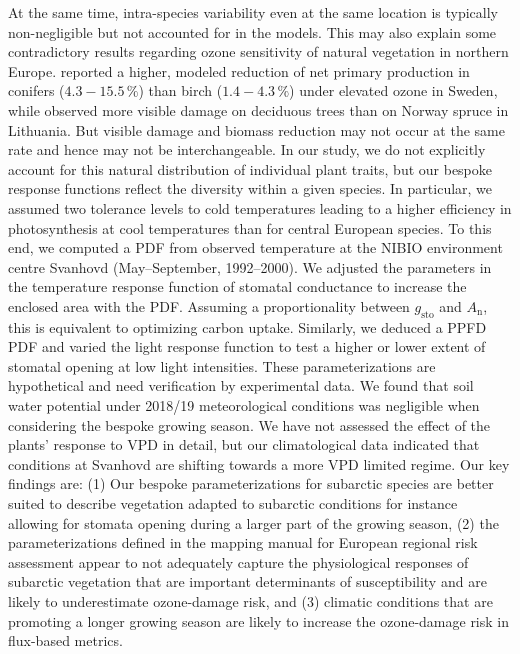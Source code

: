 \documentclass[bg, manuscript]{copernicus}
\begin{document}
At the same time, intra-species variability even at the same location is typically non-negligible \citep{EP:Bassin2004,Amb:Girgzdiene2009} but not accounted for in the models. This may also explain some contradictory results regarding ozone sensitivity of natural vegetation in northern Europe. \citet{FS:Subramanian2014} reported a higher, modeled reduction of net primary production in conifers ($4.3-15.5\,\unit{\%}$) than birch ($1.4-4.3\,\unit{\%}$) under elevated ozone in Sweden, while \citet{Amb:Girgzdiene2009} observed more visible damage on deciduous trees than on Norway spruce in Lithuania. But visible damage and biomass reduction may not occur at the same rate and hence may not be interchangeable. In our study, we do not explicitly account for this natural distribution of individual plant traits, but our bespoke response functions reflect the diversity within a given species. In particular, we assumed two tolerance levels to cold temperatures leading to a higher efficiency in photosynthesis at cool temperatures than for central European species. To this end, we computed a PDF from observed temperature at the NIBIO environment centre Svanhovd (May--September, 1992--2000). We adjusted the parameters in the temperature response function of stomatal conductance to increase the enclosed area with the PDF. Assuming a proportionality between $g_\mathrm{sto}$ and $A_\mathrm{n}$, this is equivalent to optimizing carbon uptake. Similarly, we deduced a PPFD PDF and varied the light response function to test a higher or lower extent of stomatal opening at low light intensities. These parameterizations are hypothetical and need verification by experimental data. We found that soil water potential under 2018/19 meteorological conditions was negligible when considering the bespoke growing season. We have not assessed the effect of the plants' response to VPD in detail, but our climatological data indicated that conditions at Svanhovd are shifting towards a more VPD limited regime. Our key findings are: (1) Our bespoke parameterizations for subarctic species are better suited to describe vegetation adapted to subarctic conditions for instance allowing for stomata opening during a larger part of the growing season, (2) the parameterizations defined in the mapping manual for European regional risk assessment appear to not adequately capture the physiological responses of subarctic vegetation that are important determinants of \chem{[O_3]} susceptibility and are likely to underestimate ozone-damage risk, and (3) climatic conditions that are promoting a longer growing season are likely to increase the ozone-damage risk in flux-based metrics.
\end{document}
